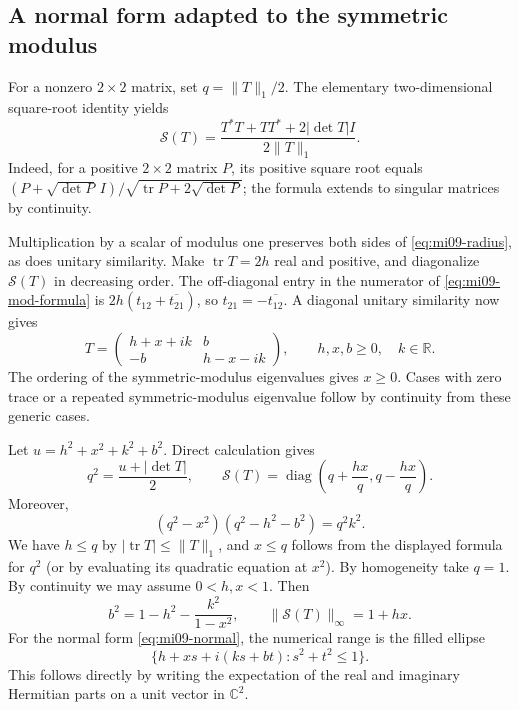 \documentclass[10pt,a4paper]{article}
\theoremstyle{remark}
\newcommand{\C}{\mathbb C}
\newcommand{\R}{\mathbb R}
\newcommand{\tr}{\operatorname{tr}}
\newcommand{\diag}{\operatorname{diag}}
\newcommand{\opnorm}[1]{\lVert #1\rVert_{\infty}}
\newcommand{\symmod}{\mathcal S}
\begin{document}
\subsection{A normal form adapted to the symmetric modulus}
For a nonzero $2\times2$ matrix, set $q=\|T\|_1/2$. The elementary two-dimensional square-root identity yields
\begin{equation}\label{eq:mi09-mod-formula}
 \symmod(T)=\frac{T^*T+TT^*+2|\det T|I}{2\|T\|_1}.
\end{equation}
Indeed, for a positive $2\times2$ matrix $P$, its positive square root equals
$(P+\sqrt{\det P}\,I)/\sqrt{\tr P+2\sqrt{\det P}}$; the formula extends to singular matrices by continuity.

Multiplication by a scalar of modulus one preserves both sides of \eqref{eq:mi09-radius}, as does unitary similarity. Make $\tr T=2h$ real and positive, and diagonalize $\symmod(T)$ in decreasing order. The off-diagonal entry in the numerator of \eqref{eq:mi09-mod-formula} is $2h(t_{12}+\overline{t_{21}})$, so $t_{21}=-\overline{t_{12}}$. A diagonal unitary similarity now gives
\begin{equation}\label{eq:mi09-normal}
 T=\begin{pmatrix}h+x+ik&b\\-b&h-x-ik\end{pmatrix},
 \qquad h,x,b\geq0,\quad k\in\R.
\end{equation}
The ordering of the symmetric-modulus eigenvalues gives $x\geq0$. Cases with zero trace or a repeated symmetric-modulus eigenvalue follow by continuity from these generic cases.

Let $u=h^2+x^2+k^2+b^2$. Direct calculation gives
\[
 q^2=\frac{u+|\det T|}{2},\qquad
 \symmod(T)=\diag\left(q+\frac{hx}{q},q-\frac{hx}{q}\right).
\]
Moreover,
\[
 (q^2-x^2)(q^2-h^2-b^2)=q^2k^2.
\]
We have $h\leq q$ by $|\tr T|\leq\|T\|_1$, and $x\leq q$ follows from the displayed formula for $q^2$ (or by evaluating its quadratic equation at $x^2$). By homogeneity take $q=1$. By continuity we may assume $0<h,x<1$. Then
\begin{equation}\label{eq:mi09-b}
 b^2=1-h^2-\frac{k^2}{1-x^2},\qquad
 \opnorm{\symmod(T)}=1+hx.
\end{equation}
For the normal form \eqref{eq:mi09-normal}, the numerical range is the filled ellipse
\[
 \{h+xs+i(ks+bt):s^2+t^2\leq1\}.
\]
This follows directly by writing the expectation of the real and imaginary Hermitian parts on a unit vector in $\C^2$.
\end{document}

